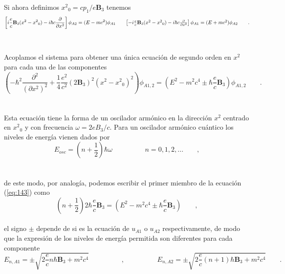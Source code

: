 \documentclass[11pt,letterpaper]{article}     %
\begin{document}
Si ahora definimos  ${x^2}_0 =c p_1 /e \textbf{B}_3$ tenemos
\begin{equation}\label{eq:142}
\left[ i \frac{e}{c}  \textbf{B}_3 (x^2 - {x^2}_0) -i \hbar c \frac{\partial}{\partial x^2} \right]\phi_{A2}=(E-mc^2)\phi_{A1} \qquad  {} $$\\$$
\left[ -i \frac{e}{c} \textbf{B}_3 (x^2 - {x^2}_0) -i \hbar c \frac{\partial}{\partial x^2}\right]\phi_{A1}=(E+mc^2)\phi_{A2}\qquad .
\end{equation} \\ \\
Acoplamos el sistema para obtener una única ecuación de segundo orden en $x^2$ para cada una de las componentes
\begin{equation}\label{eq:143}
\left(-\hbar^2 \frac{\partial^2}{(\partial x^2)^2}+ \frac{1}{4} \frac{e^2}{c^2}(2 \textbf{B}_3)^2(x^2-{x^2}_0)^2\right) \phi_{A1,2}=(E^2 -m^2c^4 \pm \hbar \frac{e}{c}\textbf{B}_3) \phi_{A1,2} \qquad.
\end{equation} \\ \\
Esta ecuación tiene la forma de un oscilador armónico en la dirección $x^2$ centrado en ${x^2}_0$ y con frecuencia $\omega=2eB_3 /c$. Para un oscilador armónico cuántico los niveles de energía vienen dados por
\begin{equation}\label{eq:144}
E_{osc}=\left(n+\frac{1}{2}\right)\hbar \omega \hspace{2cm} n=0,1,2,... \qquad ,
\end{equation} \\ \\
de este modo, por analogía, podemos escribir el primer miembro de la ecuación (\ref{eq:143}) como
\begin{equation}\label{eq:145}
\left(n+\frac{1}{2} \right) 2\hbar \frac{e}{c} \textbf{B}_3=\left(E^2-m^2c^4 \pm \hbar \frac{e}{c} \textbf{B}_3 \right) \qquad ,
\end{equation} \\
el signo $\pm$ depende de si es la ecuación de $u_{A1}$ o $u_{A2}$ respectivamente, de modo que la expresión de los niveles de energía permitida son diferentes para cada componente
\begin{equation}\label{eq:146}
E_{n,A1}=\pm\sqrt{2\frac{e}{c} n \hbar \textbf{B}_3 + m^2c^4} \hspace{2cm}, \hspace{2cm } E_{n,A2}=\pm\sqrt{2\frac{e}{c} (n+1) \hbar \textbf{B}_3 + m^2c^4} \qquad .
\end{equation} \\ \\
\end{document}
